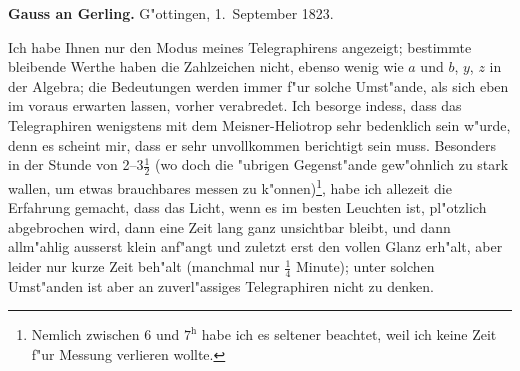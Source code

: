 \documentclass[12pt,a4paper]{article}
\theoremstyle{plain}
\theoremstyle{definition}
\theoremstyle{remark}
\begin{document}
\medskip
\noindent \textbf{Gauss an Gerling.} G"ottingen, 1.~September 1823.

\medskip
\noindent Ich habe Ihnen nur den Modus meines Telegraphirens angezeigt; bestimmte bleibende Werthe haben die Zahlzeichen nicht, ebenso wenig wie $a$ und $b$, $y$, $z$ in der Algebra; die Bedeutungen werden immer f"ur solche Umst"ande, als sich eben im voraus erwarten lassen, vorher verabredet. Ich besorge indess, dass das Telegraphiren wenigstens mit dem Meisner-Heliotrop sehr bedenklich sein w"urde, denn es scheint mir, dass er sehr unvollkommen berichtigt sein muss. Besonders in der Stunde von 2--$3\frac{1}{2}$ (wo doch die "ubrigen Gegenst"ande gew"ohnlich zu stark wallen, um etwas brauchbares messen zu k"onnen)\footnote{Nemlich zwischen 6 und $7^{\mathrm{h}}$ habe ich es seltener beachtet, weil ich keine Zeit f"ur Messung verlieren wollte.}, habe ich allezeit die Erfahrung gemacht, dass das Licht, wenn es im besten Leuchten ist, pl"otzlich abgebrochen wird, dann eine Zeit lang ganz unsichtbar bleibt, und dann allm"ahlig ausserst klein anf"angt und zuletzt erst den vollen Glanz erh"alt, aber leider nur kurze Zeit beh"alt (manchmal nur $\frac{1}{4}$ Minute); unter solchen Umst"anden ist aber an zuverl"assiges Telegraphiren nicht zu denken.
\end{document}
